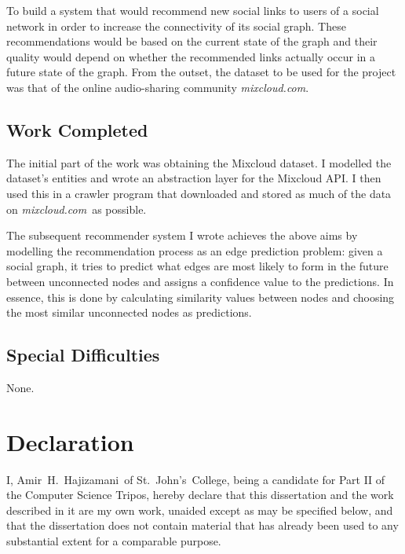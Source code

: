 \documentclass[a4paper,12pt,twoside,notitlepage]{report}
\def\authorname{Amir~H.~Hajizamani}
\def\authorcollege{St.~John's~College}
\def\mixurl{\emph{mixcloud.com}}
\begin{document}
To build a system that would recommend new social links to users of a social
network in order to increase the connectivity of its social graph. These
recommendations would be based on the current state of the graph and their
quality would depend on whether the recommended links actually occur in a
future state of the graph. From the outset, the dataset to be used for the
project was that of the online audio-sharing community \mixurl.

\subsection*{Work Completed}

The initial part of the work was obtaining the Mixcloud dataset. I modelled the
dataset's entities and wrote an abstraction layer for the Mixcloud API. I
then used this in a crawler program that downloaded and stored as much of the
data on \mixurl\ as possible.

The subsequent recommender system I wrote achieves the above aims by modelling
the recommendation process as an edge prediction problem: given a social graph,
it tries to predict what edges are most likely to form in the future between
unconnected nodes and assigns a confidence value to the predictions. In essence,
this is done by calculating similarity values between nodes and choosing the
most similar unconnected nodes as predictions.

\subsection*{Special Difficulties}

None.

\newpage

\section*{Declaration}

I, \authorname~of \authorcollege, being a candidate for Part II of the Computer
Science Tripos, hereby declare that this dissertation and the work described in
it are my own work, unaided except as may be specified below, and that
the dissertation does not contain material that has already been used to any
substantial extent for a comparable purpose.

\bigskip
\bigskip
\bigskip
{}
\end{document}
